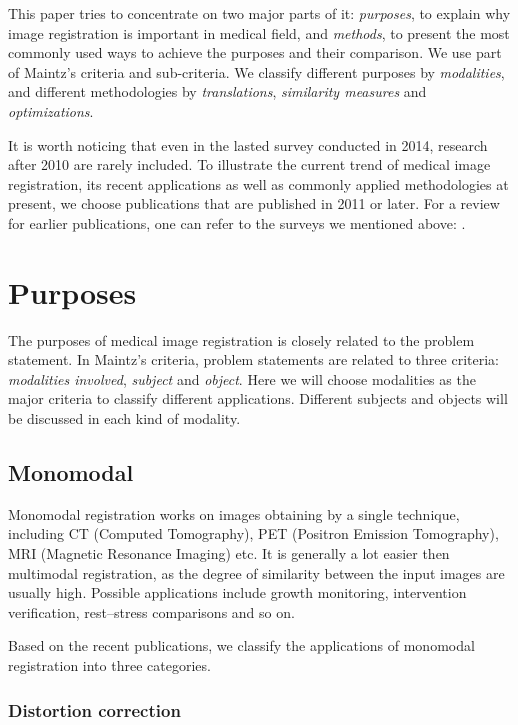 \documentclass{IEEEtran}
\begin{document}
  This paper tries to concentrate on two major parts of it: \emph{purposes}, to explain why image registration is important in medical field, and \emph{methods}, to present the most commonly used ways to achieve the purposes and their comparison. We use part of Maintz's \cite{maintz1998survey} criteria and sub-criteria. We classify different purposes by \emph{modalities}, and different methodologies by \emph{translations}, \emph{similarity measures} and \emph{optimizations}.

  It is worth noticing that even in the lasted survey conducted in 2014, research after 2010 are rarely included. To illustrate the current trend of medical image registration, its recent applications as well as commonly applied methodologies at present, we choose publications that are published in 2011 or later. For a review for earlier publications, one can refer to the surveys we mentioned above: \cite{van1993medical, maintz1998survey, hill2001medical, sotiras2013deformable, mani2013survey, oliveira2014medical}.

  \section{Purposes}

  The purposes of medical image registration is closely related to the problem statement. In Maintz's \cite{maintz1998survey} criteria, problem statements are related to three criteria: \emph{modalities involved}, \emph{subject} and \emph{object}. Here we will choose modalities as the major criteria to classify different applications. Different subjects and objects will be discussed in each kind of modality.

  \subsection{Monomodal}
  Monomodal registration works on images obtaining by a single technique, including CT (Computed Tomography), PET (Positron Emission Tomography), MRI (Magnetic Resonance Imaging) etc. It is generally a lot easier then multimodal registration, as the degree of similarity between the input images are usually high. Possible applications include growth monitoring, intervention verification, rest–stress comparisons and so on. \cite{maintz1998survey}

  Based on the recent publications, we classify the applications of monomodal registration into three categories.

  \subsubsection{Distortion correction}
\end{document}

